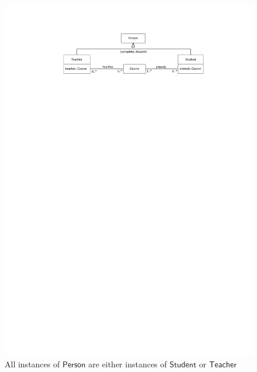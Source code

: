\documentclass{amsart}
\begin{document}
    \begin{figure}
    \centering \includegraphics[trim = 40mm 235mm 30mm 20mm, clip, scale=0.9]{./UniversityClassDiagram1Simplified.pdf}
    \caption{All instances of $\mathsf{Person}$ are either instances of $\mathsf{Student}$ or $\mathsf{Teacher}$}\label{fig_UniversityClassDiagram1}
    \end{figure}   
        
\end{document}
